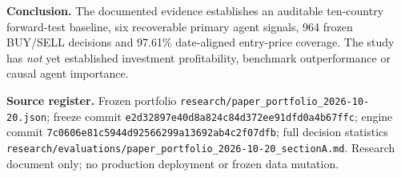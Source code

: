 \documentclass[11pt,a4paper]{article}
\begin{document}
\textbf{Conclusion.} The documented evidence establishes an auditable ten-country forward-test baseline, six recoverable primary agent signals, 964 frozen BUY/SELL decisions and 97.61\% date-aligned entry-price coverage. The study has \emph{not} yet established investment profitability, benchmark outperformance or causal agent importance.

\vspace{1em}
\noindent\textbf{Source register.} Frozen portfolio \texttt{research/paper\_portfolio\_2026-10-20.json};
freeze commit \texttt{e2d32897e40d8a824c84d372ee91dfd0a4b67ffc};
engine commit \texttt{7c0606e81c5944d92566299a13692ab4c2f07dfb};
full decision statistics \texttt{research/evaluations/paper\_portfolio\_2026-10-20\_sectionA.md}.
Research document only; no production deployment or frozen data mutation.
\end{document}
